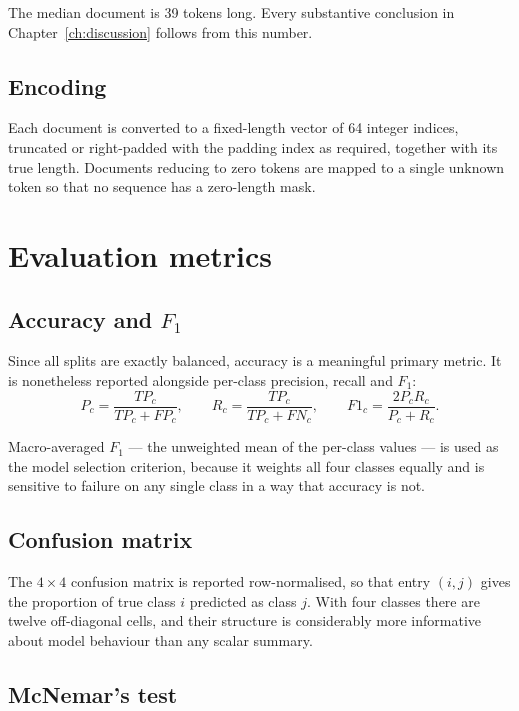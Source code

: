  The median document is 39 tokens long. Every
substantive conclusion in Chapter~\ref{ch:discussion} follows from this number.

\subsection{Encoding}

Each document is converted to a fixed-length vector of 64 integer indices, truncated or
right-padded with the padding index as required, together with its true length. Documents reducing
to zero tokens are mapped to a single unknown token so that no sequence has a zero-length mask.

\section{Evaluation metrics}

\subsection{Accuracy and $F_1$}

Since all splits are exactly balanced, accuracy is a meaningful primary metric. It is nonetheless
reported alongside per-class precision, recall and $F_1$:
\begin{equation}
P_c = \frac{TP_c}{TP_c + FP_c}, \qquad
R_c = \frac{TP_c}{TP_c + FN_c}, \qquad
F1_c = \frac{2 P_c R_c}{P_c + R_c}.
\end{equation}

Macro-averaged $F_1$ --- the unweighted mean of the per-class values --- is used as
the model selection criterion, because it weights all four classes equally and is sensitive to
failure on any single class in a way that accuracy is not.

\subsection{Confusion matrix}

The $4\times4$ confusion matrix is reported row-normalised, so that entry $(i,j)$ gives the
proportion of true class $i$ predicted as class $j$. With four classes there are twelve
off-diagonal cells, and their structure is considerably more informative about model behaviour
than any scalar summary.

\subsection{McNemar's test}
\label{sec:mcnemar}

